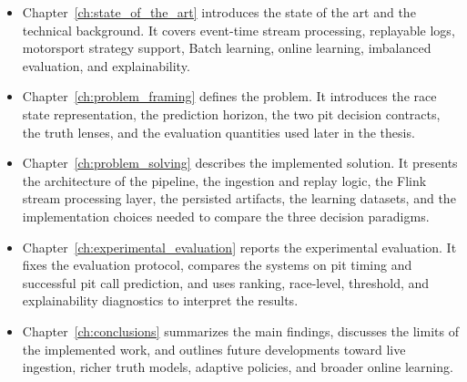 \begin{itemize}
    \item Chapter~\ref{ch:state_of_the_art} introduces the state of the art and the technical background. It covers event-time stream processing, replayable logs, motorsport
          strategy support, Batch learning, online learning, imbalanced evaluation, and explainability.

    \item Chapter~\ref{ch:problem_framing} defines the problem. It introduces the race state representation, the prediction horizon, the two pit decision contracts, the truth lenses,
          and the evaluation quantities used later in the thesis.

    \item Chapter~\ref{ch:problem_solving} describes the implemented solution. It presents the architecture of the pipeline, the ingestion and replay logic, the Flink stream
          processing layer, the persisted artifacts, the learning datasets, and the implementation choices needed to compare the three decision paradigms.

    \item Chapter~\ref{ch:experimental_evaluation} reports the experimental evaluation. It fixes the evaluation protocol, compares the systems on pit timing and successful pit call
          prediction, and uses ranking, race-level, threshold, and explainability diagnostics to interpret the results.

    \item Chapter~\ref{ch:conclusions} summarizes the main findings, discusses the limits of the implemented work, and outlines future developments toward live ingestion,
          richer truth models, adaptive policies, and broader online learning.

\end{itemize}
